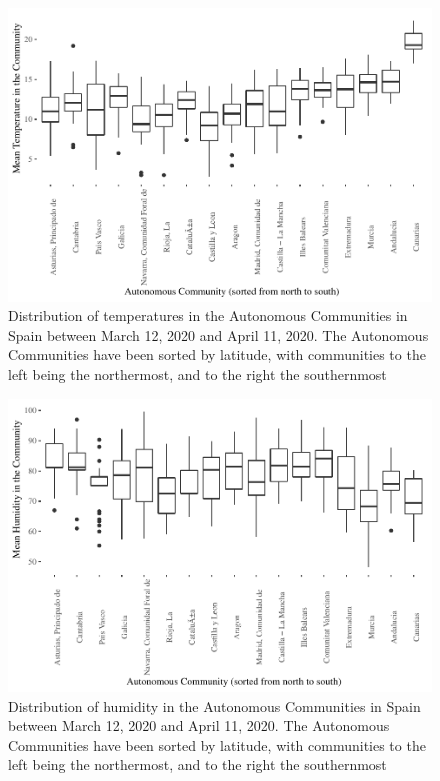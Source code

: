 \documentclass[]{elsarticle} %
\makeatletter
\def\maxwidth{\ifdim\Gin@nat@width>\linewidth\linewidth
\else\Gin@nat@width\fi}
\let\Oldincludegraphics\includegraphics
\renewcommand{\includegraphics}[1]{\Oldincludegraphics[width=\maxwidth]{#1}}
\makeatother
\begin{document}
\begin{figure}
\centering
\includegraphics{Environmental-Correlates-of-COVID19-Spain_files/figure-latex/descriptives-temperature-1.pdf}
\caption{\label{fig:descriptives-temperature} Distribution of
temperatures in the Autonomous Communities in Spain between March 12,
2020 and April 11, 2020. The Autonomous Communities have been sorted by
latitude, with communities to the left being the northermost, and to the
right the southernmost}
\end{figure}

\begin{figure}
\centering
\includegraphics{Environmental-Correlates-of-COVID19-Spain_files/figure-latex/descriptives-humidity-1.pdf}
\caption{\label{fig:descriptives-humidity} Distribution of humidity in
the Autonomous Communities in Spain between March 12, 2020 and April 11,
2020. The Autonomous Communities have been sorted by latitude, with
communities to the left being the northermost, and to the right the
southernmost}
\end{figure}
\end{document}
